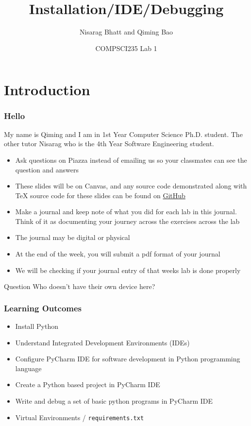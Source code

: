 \documentclass{beamer}
\title[COMPSCI 235 Lab 1 (2020)]
{Installation/IDE/Debugging}
\author{Nisarag Bhatt and Qiming Bao}
\date[August 2020] 
{COMPSCI235 Lab 1}
\begin{document}
\frame{\titlepage}
\section{Introduction}
\begin{frame}
  \frametitle{Hello}
  My name is Qiming and I am in 1st Year Computer Science Ph.D. student. The other tutor Nisarag who is the 4th Year Software Engineering student.
  \begin{itemize}
    \item Ask questions on Piazza instead of emailing us so your classmates can see the question and answers 
    \item These slides will be on Canvas, and any source code demonstrated along with TeX source code for these slides can be found on \href{https://github.com/FocalChord/compsci-235-labs}{GitHub}
  \end{itemize}
\end{frame}
\begin{frame}
  \begin{itemize}
  	\item Make a journal and keep note of what you did for each lab in this journal. Think of it as documenting your journey across the exercises across the lab
  	\item The journal may be digital or physical
  	\item At the end of the week, you will submit a pdf format of your journal
    \item We will be checking if your journal entry of that weeks lab is done properly 
  \end{itemize}
\end{frame}
\begin{frame}
  \begin{block}{Question}
  	Who doesn't have their own device here?
  \end{block}  
\end{frame}
\begin{frame}
  \frametitle{Learning Outcomes}
  \begin{itemize}
  	\item Install Python
    \item Understand Integrated Development Environments (IDEs)
    \item Configure PyCharm IDE for software development in Python programming language
    \item Create a Python based project in PyCharm IDE
    \item Write and debug a set of basic python programs in PyCharm IDE
    \item Virtual Environments / \texttt{requirements.txt}
  \end{itemize}
\end{frame}
\end{document}
